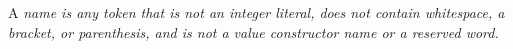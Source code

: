 \documentclass[]{article}
\begin{document}
A \it{name} is any token that is not an integer literal, 
does not contain whitespace, a bracket, or parenthesis, 
and is not a value constructor name or a reserved word.

\bigskip 



    
    
        
        
        
        
        
        
        
        

    
    
\end{document}
